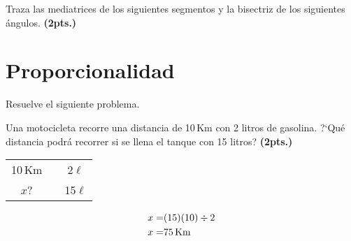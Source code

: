 \documentclass[11pt]{article}
\begin{document}
\vspace{4cm}

Traza las mediatrices de los siguientes segmentos y la bisectriz de los
siguientes \'angulos. \hfill  \textbf{(2pts.)}

\vspace{1cm}

\begin{center}
\end{center}

\section{Proporcionalidad} %
\label{sec:proporcionalidad}
Resuelve el siguiente problema.

Una motocicleta recorre una distancia de 10\,Km con 2 litros de gasolina.
?`Qu\'e distancia podr\'a recorrer si se llena el tanque con 15 litros? \hfill
\textbf{(2pts.)}

\begin{center}
\begin{tabular}{ccc}
10\,Km & \qquad\qquad & 2$\ell$ \\
$x$? && 15$\ell$
\end{tabular}

\vspace{5mm}

\begin{align*}
    x =& (15)(10)\div 2 \\
    x =& 75\text{\,Km}
\end{align*}


\end{center}

\end{document}
